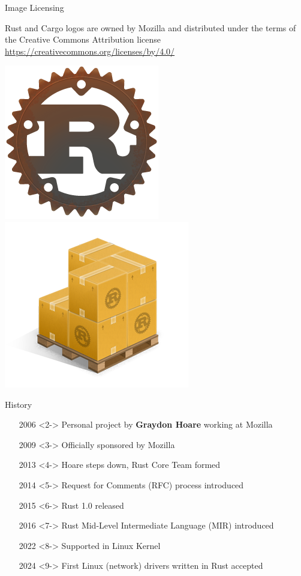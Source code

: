 \documentclass{beamer}
\begin{document}
\begin{frame}{Image Licensing} 

Rust and Cargo logos are owned by Mozilla and distributed under the terms of the Creative Commons Attribution license  \url{https://creativecommons.org/licenses/by/4.0/}
\begin{center}
\includegraphics[scale=0.4]{rust-logo-256x256}
\includegraphics[scale=0.4]{Cargo-Logo-Small}
\end{center}
\end{frame} 




\begin{frame}{History}
    \begin{itemize}
        \item[2006]<2-> Personal project by \textbf{Graydon Hoare} working at Mozilla
        \item[2009]<3-> Officially sponsored by Mozilla
        \item[2013]<4-> Hoare steps down, Rust Core Team formed
        \item[2014]<5-> Request for Comments (RFC) process introduced
        \item[2015]<6-> Rust 1.0 released
        \item[2016]<7-> Rust Mid-Level Intermediate Language (MIR) introduced
        \item[2022]<8-> Supported in Linux Kernel
        \item[2024]<9-> First Linux (network) drivers written in Rust accepted
	\end{itemize}
\end{frame}
\end{document}
